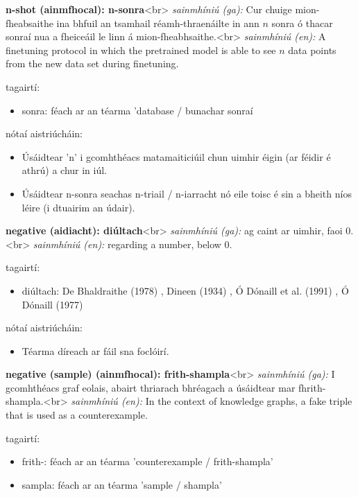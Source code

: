 \documentclass{article}
\begin{document}
\textbf{n-shot (ainmfhocal): n-sonra}<br>
\textit{sainmhíniú (ga):} Cur chuige mion-fheabsaithe ina bhfuil an tsamhail réamh-thraenáilte in ann $n$ sonra ó thacar sonraí nua a fheiceáil le linn á mion-fheabhsaithe.<br>
\textit{sainmhíniú (en):} A finetuning protocol in which the pretrained model is able to see $n$ data points from the new data set during finetuning.

tagairtí:
\begin{itemize}
	\item sonra: féach ar an téarma 'database / bunachar sonraí
\end{itemize}

nótaí aistriúcháin:
\begin{itemize}
	\item Úsáidtear 'n' i gcomhthéacs matamaiticiúil chun uimhir éigin (ar féidir é athrú) a chur in iúl.
	\item Úsáidtear n-sonra seachas n-triail / n-iarracht nó eile toisc é sin a bheith níos léire (i dtuairim an údair).
\end{itemize}


\textbf{negative (aidiacht): diúltach}<br>
\textit{sainmhíniú (ga):} ag caint ar uimhir, faoi 0.<br>
\textit{sainmhíniú (en):} regarding a number, below 0.

tagairtí:
\begin{itemize}
	\item diúltach: De Bhaldraithe (1978) \cite{de-bhaldraithe}, Dineen (1934) \cite{dineen}, Ó Dónaill et al. (1991) \cite{focloir-beag}, Ó Dónaill (1977) \cite{odonaill}
\end{itemize}

nótaí aistriúcháin:
\begin{itemize}
	\item Téarma díreach ar fáil sna foclóirí.
\end{itemize}


\textbf{negative (sample) (ainmfhocal): frith-shampla}<br>
\textit{sainmhíniú (ga):} I gcomhthéacs graf eolais, abairt thriarach bhréagach a úsáidtear mar fhrith-shampla.<br>
\textit{sainmhíniú (en):} In the context of knowledge graphs, a fake triple that is used as a counterexample.

tagairtí:
\begin{itemize}
	\item frith-: féach ar an téarma 'counterexample / frith-shampla'
	\item sampla: féach ar an téarma 'sample / shampla'
\end{itemize}
\end{document}
